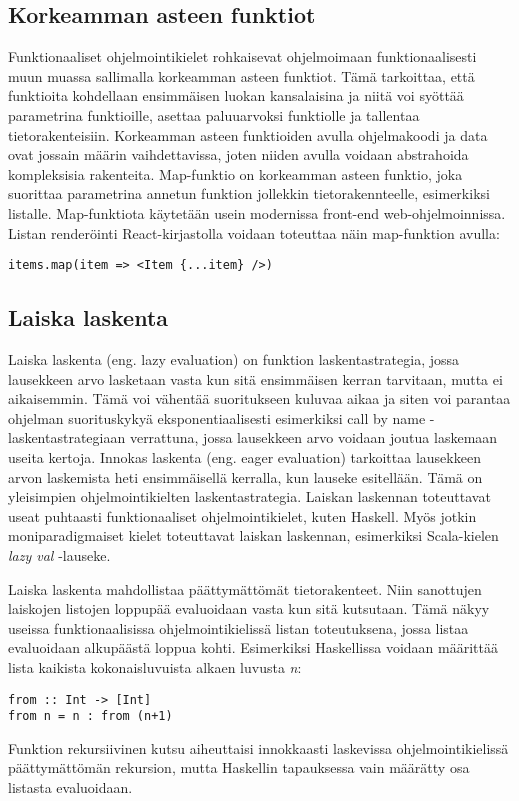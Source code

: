 \subsection{Korkeamman asteen funktiot}
Funktionaaliset ohjelmointikielet rohkaisevat ohjelmoimaan funktionaalisesti muun muassa sallimalla korkeamman asteen
funktiot. Tämä tarkoittaa, että funktioita kohdellaan ensimmäisen luokan kansalaisina ja niitä voi syöttää parametrina
funktioille, asettaa paluuarvoksi funktiolle ja tallentaa tietorakenteisiin. Korkeamman asteen funktioiden avulla
ohjelmakoodi ja data ovat jossain määrin vaihdettavissa, joten niiden avulla voidaan abstrahoida kompleksisia
rakenteita.\cite{hudak} Map-funktio on korkeamman asteen funktio, joka suorittaa parametrina annetun funktion jollekkin
tietorakennteelle, esimerkiksi listalle. Map-funktiota käytetään usein modernissa front-end
web-ohjelmoinnissa\cite{functionalreact}. Listan renderöinti React-kirjastolla voidaan toteuttaa näin
map-funktion avulla:
\begin{verbatim}
items.map(item => <Item {...item} />)
\end{verbatim}

\subsection{Laiska laskenta}
Laiska laskenta (eng. lazy evaluation) on funktion laskentastrategia, jossa lausekkeen arvo lasketaan vasta kun sitä
ensimmäisen kerran tarvitaan, mutta ei aikaisemmin. Tämä voi vähentää suoritukseen kuluvaa aikaa ja siten voi parantaa
ohjelman suorituskykyä eksponentiaalisesti esimerkiksi call by name -laskentastrategiaan verrattuna, jossa lausekkeen
arvo voidaan joutua laskemaan useita kertoja. Innokas laskenta (eng. eager evaluation) tarkoittaa lausekkeen arvon
laskemista heti ensimmäisellä kerralla, kun lauseke esitellään. Tämä on yleisimpien ohjelmointikielten
laskentastrategia. Laiskan laskennan toteuttavat useat puhtaasti funktionaaliset ohjelmointikielet, kuten Haskell. Myös
jotkin moniparadigmaiset kielet toteuttavat laiskan laskennan, esimerkiksi Scala-kielen \textit{lazy val}
-lauseke.\cite{languagedesign}

Laiska laskenta mahdollistaa päättymättömät tietorakenteet. Niin sanottujen laiskojen listojen loppupää evaluoidaan
vasta kun sitä kutsutaan. Tämä näkyy useissa funktionaalisissa ohjelmointikielissä listan toteutuksena, jossa listaa
evaluoidaan alkupäästä loppua kohti. Esimerkiksi Haskellissa voidaan määrittää lista kaikista kokonaisluvuista alkaen
luvusta \textit{n}:
\begin{verbatim}
from :: Int -> [Int]
from n = n : from (n+1)
\end{verbatim}
Funktion rekursiivinen kutsu aiheuttaisi innokkaasti laskevissa ohjelmointikielissä päättymättömän rekursion, mutta
Haskellin tapauksessa vain määrätty osa listasta evaluoidaan.\cite{languagedesign}


